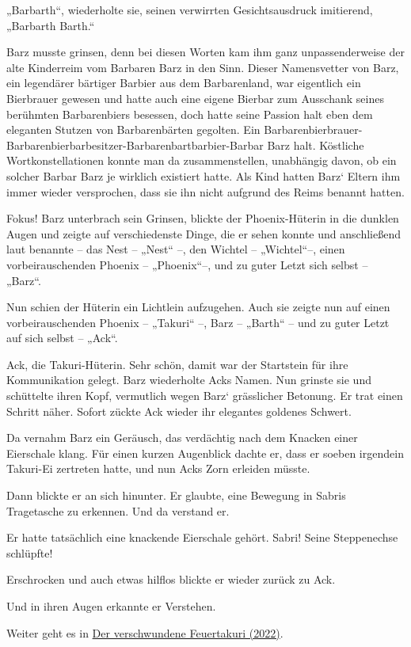 „Barbarth“, wiederholte sie, seinen verwirrten Gesichtsausdruck imitierend, „Barbarth Barth.“

Barz musste grinsen, denn bei diesen Worten kam ihm ganz unpassenderweise der alte Kinderreim vom Barbaren Barz in den Sinn. Dieser Namensvetter von Barz, ein legendärer bärtiger Barbier aus dem Barbarenland, war eigentlich ein Bierbrauer gewesen und hatte auch eine eigene Bierbar zum Ausschank seines berühmten Barbarenbiers besessen, doch hatte seine Passion halt eben dem eleganten Stutzen von Barbarenbärten gegolten. Ein Barbarenbierbrauer-Barbarenbierbarbesitzer-Barbarenbartbarbier-Barbar Barz halt. Köstliche Wortkonstellationen konnte man da zusammenstellen, unabhängig davon, ob ein solcher Barbar Barz je wirklich existiert hatte. Als Kind hatten Barz‘ Eltern ihm immer wieder versprochen, dass sie ihn nicht aufgrund des Reims benannt hatten.

Fokus! Barz unterbrach sein Grinsen, blickte der Phoenix-Hüterin in die dunklen Augen und zeigte auf verschiedenste Dinge, die er sehen konnte und anschließend laut benannte – das Nest – „Nest“ –, den Wichtel – „Wichtel“–, einen vorbeirauschenden Phoenix – „Phoenix“–, und zu guter Letzt sich selbst – „Barz“.

Nun schien der Hüterin ein Lichtlein aufzugehen. Auch sie zeigte nun auf einen vorbeirauschenden Phoenix – „Takuri“ –, Barz – „Barth“ – und zu guter Letzt auf sich selbst – „Ack“.

Ack, die Takuri-Hüterin. Sehr schön, damit war der Startstein für ihre Kommunikation gelegt. Barz wiederholte Acks Namen. Nun grinste sie und schüttelte ihren Kopf, vermutlich wegen Barz‘ grässlicher Betonung. Er trat einen Schritt näher. Sofort zückte Ack wieder ihr elegantes goldenes Schwert.

Da vernahm Barz ein Geräusch, das verdächtig nach dem Knacken einer Eierschale klang. Für einen kurzen Augenblick dachte er, dass er soeben irgendein Takuri-Ei zertreten hatte, und nun Acks Zorn erleiden müsste.

Dann blickte er an sich hinunter. Er glaubte, eine Bewegung in Sabris Tragetasche zu erkennen. Und da verstand er.

Er hatte tatsächlich eine knackende Eierschale gehört. Sabri! Seine Steppenechse schlüpfte!

Erschrocken und auch etwas hilflos blickte er wieder zurück zu Ack.

Und in ihren Augen erkannte er Verstehen.

\begin{commentbox}
    Weiter geht es in \hyperref[2022-der-verschwundene-feuertakuri]{Der verschwundene Feuertakuri (2022)}.
\end{commentbox}













